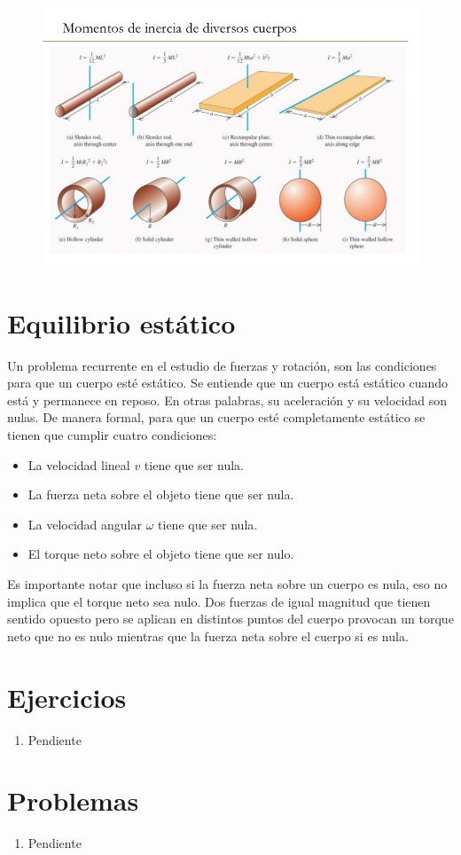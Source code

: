 \documentclass[letterpaper]{article}
\begin{document}
\begin{figure}[h]
\centering
\includegraphics[scale=0.4]{momentos_de_inercia.jpg}
\end{figure}

\section*{Equilibrio estático}

Un problema recurrente en el estudio de fuerzas y rotación, son las condiciones para que un cuerpo esté estático. Se entiende que un cuerpo está estático cuando está y permanece en reposo. En otras palabras, su aceleración y su velocidad son nulas. De manera formal, para que un cuerpo esté completamente estático se tienen que cumplir cuatro condiciones:
\begin{itemize}
\item La velocidad lineal $v$ tiene que ser nula.
\item La fuerza neta sobre el objeto tiene que ser nula.
\item La velocidad angular $\omega$ tiene que ser nula.
\item El torque neto sobre el objeto tiene que ser nulo.
\end{itemize}

Es importante notar que incluso si la fuerza neta sobre un cuerpo es nula, eso no implica que el torque neto sea nulo. Dos fuerzas de igual magnitud que tienen sentido opuesto pero se aplican en distintos puntos del cuerpo provocan un torque neto que no es nulo mientras que la fuerza neta sobre el cuerpo si es nula.



\section*{Ejercicios}

\begin{enumerate}

\item Pendiente

\end{enumerate}

\section*{Problemas}

\begin{enumerate}

\item Pendiente

\end{enumerate}
\end{document}
